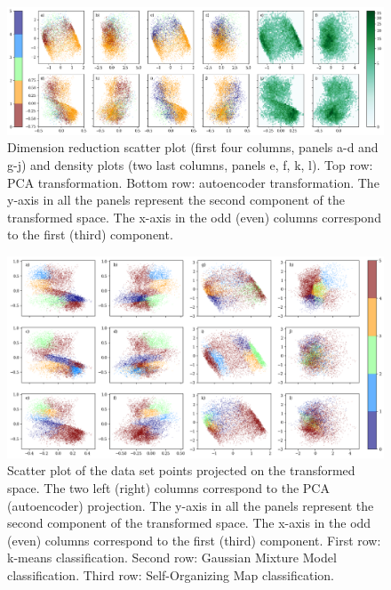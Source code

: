\documentclass[utf8]{frontiersSCNS} %
\begin{document}
\begin{figure}[h!]
	\begin{center}
		\includegraphics[width=16cm]{Roberts/dimreduc}%
	\end{center}
	\caption{Dimension reduction scatter plot (first four columns, panels a-d and g-j) and density plots (two last columns, panels e, f, k, l). Top row: PCA transformation. Bottom row: autoencoder transformation. The y-axis in all the panels represent the second component of the transformed space. The x-axis in the odd (even) columns correspond to the first (third) component.}\label{fig:dimreduc}
\end{figure}

\begin{figure}[h!]
	\begin{center}
		\includegraphics[width=16cm]{Roberts/clustering}%
	\end{center}
	\caption{Scatter plot of the data set points projected on the transformed space. The two left (right) columns correspond to the PCA (autoencoder) projection. The y-axis in all the panels represent the second component of the transformed space. The x-axis in the odd (even) columns correspond to the first (third) component. First row: k-means classification. Second row: Gaussian Mixture Model classification. Third row: Self-Organizing Map classification.}\label{fig:clustering}
\end{figure}
\end{document}
